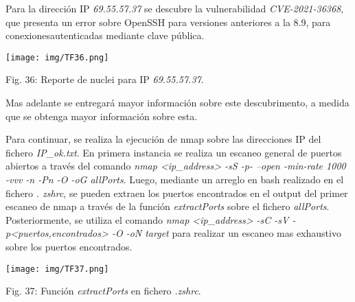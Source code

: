 \documentclass[12pt,oneside,a4paper]{book}
\begin{document}
\vspace{1em}

\hspace{20pt}
Para la dirección IP \textit{69.55.57.37} se descubre la vulnerabilidad \textit{CVE-2021-36368}, que presenta un error sobre OpenSSH para versiones anteriores a la 8.9, para conexionesautenticadas mediante clave pública.

\vspace{2em}

\begin{center}
	\texttt{[image: img/TF36.png]}
    
\vspace{0.1em}
    
    Fig. 36: Reporte de nuclei para IP \textit{69.55.57.37}.
\end{center}

\vspace{2em}

\hspace{20pt}
Mas adelante se entregará mayor información sobre este descubrimento, a medida que se obtenga mayor información sobre esta.

\vspace{1em}

\hspace{20pt}
Para continuar, se realiza la ejecución de nmap sobre las direcciones IP del fichero \textit{IP\_ok.txt}. En primera instancia se realiza un escaneo general de puertos abiertos a través del comando \textit{nmap <ip\_address> -sS -p- --open -min-rate 1000 -vvv -n -Pn -O -oG allPorts}. Luego, mediante un arreglo en bash realizado en el fichero \textit{. zshrc}, se pueden extraen los puertos encontrados en el output del primer escaneo de nmap a través de la función \textit{extractPorts} sobre el fichero \textit{allPorts}. Posteriormente, se utiliza el comando \textit{nmap <ip\_address> -sC -sV -p<puertos,encontrados> -O -oN target} para realizar un escaneo mas exhaustivo sobre los puertos encontrados.

\vspace{2em}

\begin{center}
	\texttt{[image: img/TF37.png]}
    
\vspace{0.1em}
    
    Fig. 37: Función \textit{extractPorts} en fichero \textit{.zshrc}.
\end{center}
\end{document}
